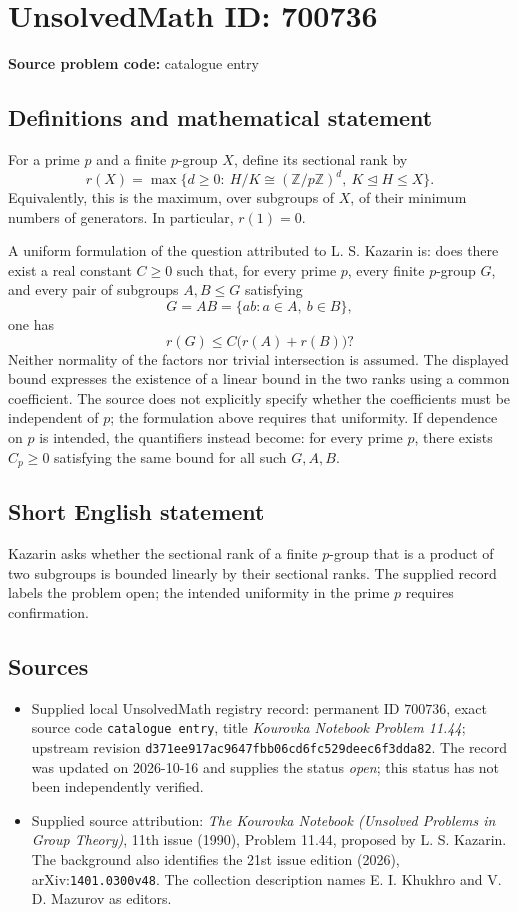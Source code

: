 \documentclass[11pt]{article}
\newcommand{\Z}{\mathbb{Z}}
\begin{document}
\section*{UnsolvedMath ID: 700736}
\textbf{Source problem code:} catalogue entry
\subsection{Definitions and mathematical statement}
For a prime \(p\) and a finite \(p\)-group \(X\), define its sectional rank by
\[
r(X)=\max\bigl\{d\geq 0:\ H/K\cong (\Z/p\Z)^d,\ K\trianglelefteq H\leq X\bigr\}.
\]
Equivalently, this is the maximum, over subgroups of \(X\), of their minimum numbers of generators. In particular, \(r(1)=0\).

A uniform formulation of the question attributed to L. S. Kazarin is: does there exist a real constant \(C\geq 0\) such that, for every prime \(p\), every finite \(p\)-group \(G\), and every pair of subgroups \(A,B\leq G\) satisfying
\[
G=AB=\{ab:a\in A,\ b\in B\},
\]
one has
\[
r(G)\leq C\bigl(r(A)+r(B)\bigr)?
\]
Neither normality of the factors nor trivial intersection is assumed. The displayed bound expresses the existence of a linear bound in the two ranks using a common coefficient. The source does not explicitly specify whether the coefficients must be independent of \(p\); the formulation above requires that uniformity. If dependence on \(p\) is intended, the quantifiers instead become: for every prime \(p\), there exists \(C_p\geq 0\) satisfying the same bound for all such \(G,A,B\).
\subsection{Short English statement}
Kazarin asks whether the sectional rank of a finite \(p\)-group that is a product of two subgroups is bounded linearly by their sectional ranks. The supplied record labels the problem open; the intended uniformity in the prime \(p\) requires confirmation.
\subsection{Sources}
\begin{itemize}
\item Supplied local UnsolvedMath registry record: permanent ID \(700736\), exact source code \texttt{catalogue entry}, title \emph{Kourovka Notebook Problem 11.44}; upstream revision \texttt{d371ee917ac9647fbb06cd6fc529deec6f3dda82}. The record was updated on 2026-10-16 and supplies the status \emph{open}; this status has not been independently verified.
\item Supplied source attribution: \emph{The Kourovka Notebook (Unsolved Problems in Group Theory)}, 11th issue (1990), Problem 11.44, proposed by L. S. Kazarin. The background also identifies the 21st issue edition (2026), arXiv:\texttt{1401.0300v48}. The collection description names E. I. Khukhro and V. D. Mazurov as editors.
\end{itemize}
\end{document}
